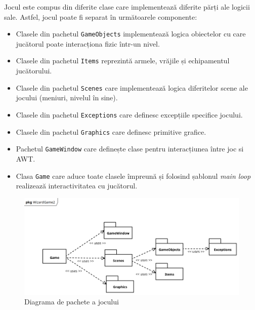 \documentclass{article}
\begin{document}
    Jocul este compus din diferite clase care implementează diferite părți ale logicii sale. Astfel,
    jocul poate fi separat în următoarele componente:
    \begin{itemize}
        \item Clasele din pachetul \texttt{GameObjects} implementează logica obiectelor cu care
        jucătorul poate interacționa fizic într-un nivel.
        \item Clasele din pachetul \texttt{Items} reprezintă armele, vrăjile și echipamentul
        jucătorului.
        \item Clasele din pachetul \texttt{Scenes} care implementează logica diferitelor scene ale
        jocului (meniuri, nivelul în sine).
        \item Clasele din pachetul \texttt{Exceptions} care definesc excepțiile specifice jocului.
        \item Clasele din pachetul \texttt{Graphics} care definesc primitive grafice.
        \item Pachetul \texttt{GameWindow} care definește clase pentru interacțiunea între joc si AWT.
        \item Clasa \texttt{Game} care aduce toate clasele împreună și folosind șablonul
        \emph{main loop} realizează interactivitatea cu jucătorul.
    \end{itemize}

    \begin{figure}[H]
        \includegraphics[width=\linewidth]{package-diagram}
        \centering
        \caption{Diagrama de pachete a jocului}
    \end{figure}
\end{document}
